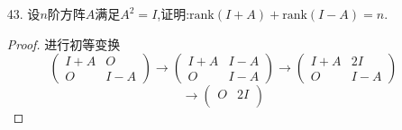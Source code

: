 \documentclass{article}
\begin{document}
\begin{enumerate}
\begin{proof}
\begin{enumerate}
\[\begin{pmatrix}
                        O & B
                    \end{pmatrix}Q
                    =\begin{pmatrix}
                        P_1 A Q_1 & P_1 C Q_2\\
                        O & P_2 B Q_2
                    \end{pmatrix}
                    =\begin{pmatrix}
                        diag(I_a,O) & P_1 C Q_2\\
                        O & diag(I_b,O)
                    \end{pmatrix}
                \]
                存在$a+b$阶子式$\begin{vmatrix} I_a & *\\ O & I_b \end{vmatrix}=1\neq 0$,因此
                \[
                    \mbox{rank}\begin{pmatrix}
                        A & C\\
                        O & B
                    \end{pmatrix}
                    =\mbox{rank}(S)\geqslant a+b =\mbox{rank}(A)+\mbox{rank}(B).
                \]
            \end{enumerate}
        \end{proof}
        \item [43.]设$n$阶方阵$A$满足$A^2=I$,证明:$\mbox{rank}(I+A)+\mbox{rank}(I-A)=n$.
        \begin{proof}
            进行初等变换
            \[
                \begin{pmatrix}
                    I+A & O\\
                    O & I-A
                \end{pmatrix}
                \longrightarrow
                \begin{pmatrix}
                    I+A & I-A\\
                    O & I-A
                \end{pmatrix}
                \longrightarrow
                \begin{pmatrix}
                    I+A & 2I\\
                    O & I-A
                \end{pmatrix}
            \]
            \[
                \longrightarrow
                \begin{pmatrix}
                    O & 2I\\

\end{pmatrix}\]
\end{proof}
\end{enumerate}
\end{document}
